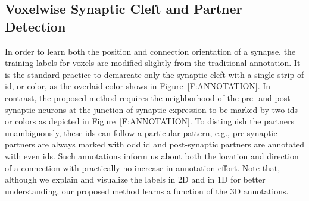 \documentclass{llncs}
\begin{document}
\subsection{Voxelwise Synaptic Cleft and Partner Detection}\label{S:PIXEL}
In order to learn both the position and connection orientation of a synapse, the training labels for voxels are modified slightly from the traditional annotation. It is the standard practice to demarcate only the synaptic cleft with a single strip of id, or color, as the overlaid color shows in Figure~\ref{F:ANNOTATION}. In contrast, the proposed method requires the neighborhood of the pre- and post-synaptic neurons at the junction of synaptic expression to be marked by two ids or colors as depicted in Figure~\ref{F:ANNOTATION}. To distinguish the partners unambiguously, these ids can follow a particular pattern, e.g., pre-synaptic partners are always marked with odd id and post-synaptic partners are annotated with even ids. Such annotations inform us about both the location and direction of a connection with practically no increase in annotation effort. Note that, although we explain and visualize the labels in 2D and in 1D for better understanding, our proposed method learns a function of the 3D annotations.   
\begin{figure*}[t]
\vspace{-0.2cm}
\begin{center}
\vspace{-0.2cm}
\vspace{-0.4cm}
\caption{\scriptsize The traditional and proposed annotation of synapses and the signed proximity function that the proposed method estimates are shown in 2D in \ref{F:PREV_LABEL}, \ref{F:PROPOSED_LABEL}, \ref{F:FUNC_APPROX} and in 1D in \ref{F:PREV_LABEL1D}, \ref{F:PROPOSED_LABEL1D}, \ref{F:FUNC_APPROX1D} respectively for illustration purposes. The U-net learns the signed proximity functions in 3D.}\label{F:ANNOTATION}
\end{center}
\vspace{-0.4cm}
\end{figure*}
\end{document}
